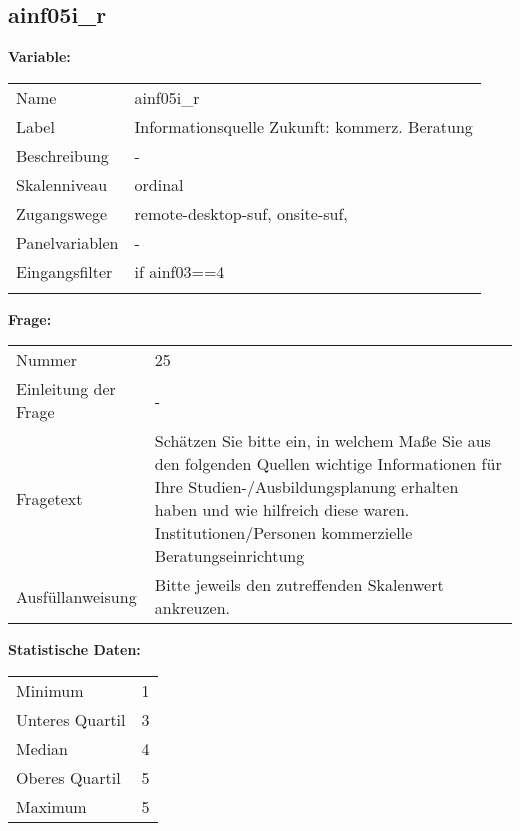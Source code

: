 	
	
	\subsection{ainf05i\_r}
	\label{subSection:ainf05i_r}

	\noindent\textbf{Variable:}\\
		\begin{tabular}{lL{11.3cm}}
			\label{tableVariable:ainf05i_r}
			Name & ainf05i\_r \\
			Label & Informationsquelle Zukunft: kommerz. Beratung \\
			Beschreibung & - \\
			Skalenniveau & ordinal \\
			Zugangswege &
				remote-desktop-suf,
				onsite-suf,
 \\
			Panelvariablen & -
			 \\
			Eingangsfilter & if ainf03==4 \\
 \\
		\end{tabular}

		\vspace*{1 cm}
		\noindent\textbf{Frage:}\\
		\begin{tabular}{lL{11.3cm}}
			\label{tableQuestion:ainf05i_r}
			Nummer & 25 \\
			Einleitung der Frage & - \\
			Fragetext & Schätzen Sie bitte ein, in welchem Maße Sie aus den folgenden Quellen wichtige Informationen für Ihre Studien-/Ausbildungsplanung erhalten haben und wie hilfreich diese waren.
Institutionen/Personen
kommerzielle Beratungseinrichtung \\
			Ausfüllanweisung & Bitte jeweils den zutreffenden Skalenwert ankreuzen. \\
		\end{tabular}


		\vspace*{1 cm}
		\noindent\textbf{Statistische Daten:}\\
			\begin{tabular}{ll}
				\label{tableStatistics:ainf05i_r}
					Minimum & 1 \\
					Unteres Quartil & 3 \\
					Median & 4 \\
					Oberes Quartil & 5 \\
					Maximum & 5 \\
			\end{tabular}



